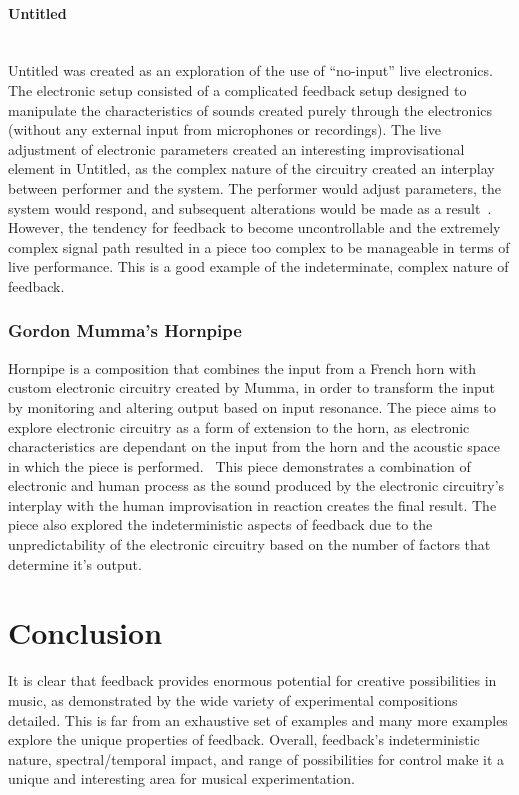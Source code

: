 \documentclass[titlepage]{scrartcl}
\begin{document}
    \paragraph{Untitled}\mbox{}\\
    Untitled was created as an exploration of the use of ``no-input'' live
    electronics. The electronic setup consisted of a complicated feedback setup
    designed to manipulate the characteristics of sounds created purely through
    the electronics (without any external input from microphones or
    recordings).
    The live adjustment of electronic parameters created an interesting
    improvisational element in Untitled, as the complex nature of the
    circuitry created an interplay between performer and the system. The
    performer would adjust parameters, the system would respond, and subsequent
    alterations would be made as a result~\parencite{tudor1984twle}.
    However, the tendency for feedback to become uncontrollable and the
    extremely complex signal path resulted in a piece too complex to be
    manageable in terms of live performance. This is a good example of the
    indeterminate, complex nature of
    feedback.~\parencite[p.83-85]{weisert2010ioi}

    \subsubsection{Gordon Mumma's Hornpipe~\citeyearpar{mumma2002lem}}\label{hornpipe}
    Hornpipe is a composition that combines the input from a French horn with
    custom electronic circuitry created by Mumma, in order to transform the input by
    monitoring and altering output based on input resonance. 
    The piece aims to explore electronic circuitry as a form of extension to
    the horn, as electronic characteristics are dependant on the input from the
    horn and the acoustic space in which the piece is
    performed.~\parencite[p.101-103]{nyman1999em}
    This piece demonstrates a combination of electronic and human process as
    the sound produced by the electronic circuitry's interplay with the human
    improvisation in reaction creates the final result.
    The piece also explored the indeterministic aspects of feedback due to the
    unpredictability of the electronic circuitry based on the number of factors
    that determine it's output.

    \section{Conclusion}
    It is clear that feedback provides enormous potential for creative
    possibilities in music, as demonstrated by the wide variety of
    experimental compositions detailed. This is far from an exhaustive set of
    examples and many more examples explore the unique properties of feedback.
    Overall, feedback's indeterministic nature, spectral/temporal impact, and
    range of possibilities for control make it a unique and interesting area
    for musical experimentation.

    \printbibliography
\end{document}
